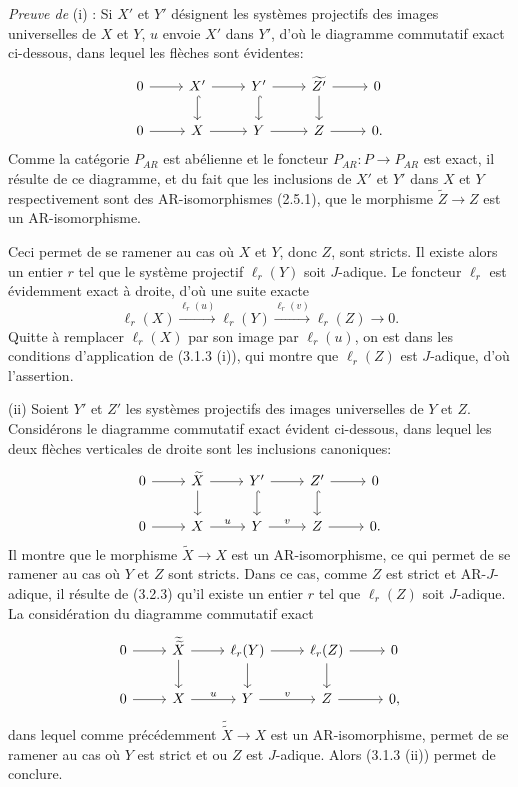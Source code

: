 \documentclass[11pt]{article}
\begin{document}
\emph{Preuve de} (i) : Si $X'$ et $Y'$ désignent les systèmes projectifs des images universelles de $X$ et $Y$, $u$ envoie $X'$ dans $Y'$, d'où le diagramme commutatif exact ci-dessous, dans lequel les flèches sont évidentes:
\[
\begin{tikzcd}
0 \arrow[r] & X' \arrow[r] \arrow[d,hook] & Y' \arrow[r] \arrow[d,hook] & \widetilde{Z'} \arrow[r] \arrow[d] & 0\\
0 \arrow[r] & X \arrow[r] & Y \arrow[r] & Z \arrow[r] & 0 .
\end{tikzcd}
\]
Comme la catégorie $P_{AR}$ est abélienne et le foncteur 
$P_{AR}\colon P\to P_{AR}$ est
exact, il résulte de ce diagramme, et du fait que les inclusions de $X'$ et $Y'$ dans $X$ et $Y$ respectivement sont des AR-isomorphismes (2.5.1), que le morphisme $\widetilde Z\to Z$ est un AR-isomorphisme.

Ceci permet de se ramener au cas où $X$ et $Y$, donc $Z$, sont stricts. Il existe alors un entier $r$ tel que le système projectif $\ell_r(Y)$ soit $J$-adique. Le foncteur $\ell_r$ est évidemment exact à droite, d'où une suite exacte
\[
\ell_r(X)\stackrel{\ell_r(u)}{\longrightarrow}\ell_r(Y)\stackrel{\ell_r(v)}{\longrightarrow}\ell_r(Z)\longrightarrow0.
\]
Quitte à remplacer $\ell_r(X)$ par son image par $\ell_r(u)$, on est dans les conditions d'application de (3.1.3 (i)), qui montre que $\ell_r(Z)$ est $J$-adique, d'où l'assertion.

(ii) Soient $Y'$ et $Z'$ les systèmes projectifs des images universelles de $Y$ et $Z$. Considérons le diagramme commutatif exact évident ci-dessous, dans lequel les deux flèches verticales de droite sont les inclusions canoniques:
\[
\begin{tikzcd}
0 \arrow[r] & \widetilde X \arrow[r] \arrow[d] & Y' \arrow[r] \arrow[d,hook] & Z' \arrow[r] \arrow[d,hook] & 0\\
0 \arrow[r] & X \arrow[r,"u"] & Y \arrow[r,"v"] & Z \arrow[r] & 0 .
\end{tikzcd}
\]
Il montre que le morphisme $\widetilde X\to X$ est un AR-isomorphisme, ce qui permet de se ramener au cas où $Y$ et $Z$ sont stricts. Dans ce cas, comme $Z$ est strict et AR-$J$-adique, il résulte de (3.2.3) qu'il existe un entier $r$ tel que $\ell_r(Z)$ soit $J$-adique. La considération du diagramme commutatif exact
\[
\begin{tikzcd}
0 \arrow[r] & \widetilde{\widetilde X} \arrow[r] \arrow[d] & \ell_r(Y) \arrow[r] \arrow[d] & \ell_r(Z) \arrow[r] \arrow[d] & 0\\
0 \arrow[r] & X \arrow[r,"u"] & Y \arrow[r,"v"] & Z \arrow[r] & 0,
\end{tikzcd}
\]
dans lequel comme précédemment $\widetilde{\widetilde X}\to X$ est un AR-isomorphisme, permet de se ramener au cas où $Y$ est strict et ou $Z$ est $J$-adique. Alors 
(3.1.3 (ii))
permet de conclure.
\end{document}
